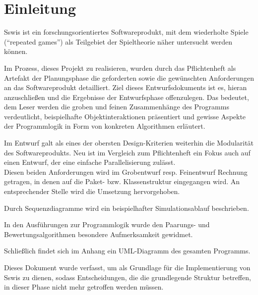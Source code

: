 \section{Einleitung}

Sswis ist ein forschungsorientiertes Softwareprodukt, mit dem wiederholte Spiele ("`repeated games"') als Teilgebiet der Spieltheorie näher untersucht werden können.

Im Prozess, dieses Projekt zu realisieren, wurden durch das Pflichtenheft als Artefakt der Planungsphase die geforderten sowie die gewünschten Anforderungen an das Softwareprodukt detailliert. Ziel dieses Entwurfsdokuments ist es, hieran anzuschließen und die Ergebnisse der Entwurfsphase offenzulegen. Das bedeutet, dem Leser werden die groben und feinen Zusammenhänge des Programms verdeutlicht, beispielhafte Objektinteraktionen präsentiert und gewisse Aspekte der Programmlogik in Form von konkreten Algorithmen erläutert.

Im Entwurf galt als eines der obersten Design-Kriterien weiterhin die Modularität des Softwareprodukts. Neu ist im Vergleich zum Pflichtenheft ein Fokus auch auf einen Entwurf, der eine einfache Parallelisierung zulässt.\\
Diesen beiden Anforderungen wird im Grobentwurf resp. Feinentwurf Rechnung getragen, in denen auf die Paket- bzw. Klassenstruktur eingegangen wird. An entsprechender Stelle wird die Umsetzung hervorgehoben.

Durch Sequenzdiagramme wird ein beispielhafter Simulationsablauf beschrieben.

In den Ausführungen zur Programmlogik wurde den Paarungs- und Bewertungsalgorithmen besondere Aufmerksamkeit gewidmet.

Schließlich findet sich im Anhang ein UML-Diagramm des gesamten Programms.


Dieses Dokument wurde verfasst, um als Grundlage für die Implementierung von Sswis zu dienen, sodass Entscheidungen, die die grundlegende Struktur betreffen, in dieser Phase nicht mehr getroffen werden müssen.